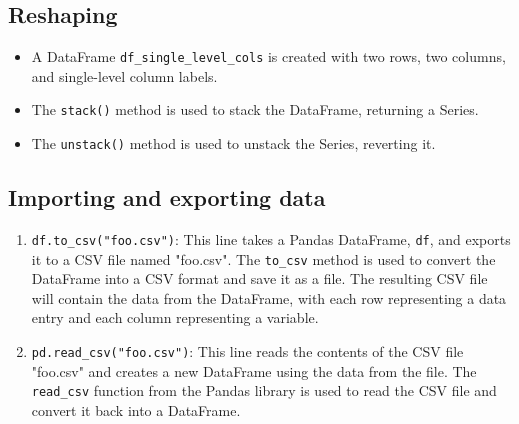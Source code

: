 \begin{code}[h!]
	    
	
	\caption{Grouping Example}
	
\end{code}

\subsection{Reshaping}

\begin{itemize}
	
	\item A DataFrame \texttt{df\_single\_level\_cols} is created with two rows, two columns, and single-level column labels.
	
	\item The \texttt{stack()} method is used to stack the DataFrame, returning a Series.
	
	\item The \texttt{unstack()} method is used to unstack the Series, reverting it.
	
\end{itemize}

\begin{code}[h!]
	    
	
	\caption{Reshaping Example}
	
\end{code}

\subsection{Importing and exporting data}

\begin{enumerate}
	\item \texttt{df.to\_csv("foo.csv")}: This line takes a Pandas DataFrame, \texttt{df}, and exports it to a CSV file named "foo.csv". The \texttt{to\_csv} method is used to convert the DataFrame into a CSV format and save it as a file. The resulting CSV file will contain the data from the DataFrame, with each row representing a data entry and each column representing a variable.
	
	\item \texttt{pd.read\_csv("foo.csv")}: This line reads the contents of the CSV file "foo.csv" and creates a new DataFrame using the data from the file. The \texttt{read\_csv} function from the Pandas library is used to read the CSV file and convert it back into a DataFrame.
\end{enumerate}

